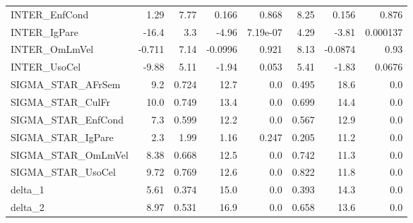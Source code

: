 \begin{tabular}{lrrrrrrr}
INTER\_EnfCond      &   1.29 &     7.77 &   0.166 &    0.868 &          8.25 &        0.156 &         0.876 \\
INTER\_IgPare       &  -16.4 &      3.3 &   -4.96 & 7.19e-07 &          4.29 &        -3.81 &      0.000137 \\
INTER\_OmLmVel      & -0.711 &     7.14 & -0.0996 &    0.921 &          8.13 &      -0.0874 &          0.93 \\
INTER\_UsoCel       &  -9.88 &     5.11 &   -1.94 &    0.053 &          5.41 &        -1.83 &        0.0676 \\
SIGMA\_STAR\_AFrSem  &    9.2 &    0.724 &    12.7 &      0.0 &         0.495 &         18.6 &           0.0 \\
SIGMA\_STAR\_CulFr   &   10.0 &    0.749 &    13.4 &      0.0 &         0.699 &         14.4 &           0.0 \\
SIGMA\_STAR\_EnfCond &    7.3 &    0.599 &    12.2 &      0.0 &         0.567 &         12.9 &           0.0 \\
SIGMA\_STAR\_IgPare  &    2.3 &     1.99 &    1.16 &    0.247 &         0.205 &         11.2 &           0.0 \\
SIGMA\_STAR\_OmLmVel &   8.38 &    0.668 &    12.5 &      0.0 &         0.742 &         11.3 &           0.0 \\
SIGMA\_STAR\_UsoCel  &   9.72 &    0.769 &    12.6 &      0.0 &         0.822 &         11.8 &           0.0 \\
delta\_1            &   5.61 &    0.374 &    15.0 &      0.0 &         0.393 &         14.3 &           0.0 \\
delta\_2            &   8.97 &    0.531 &    16.9 &      0.0 &         0.658 &         13.6 &           0.0 \\
\bottomrule
\end{tabular}

